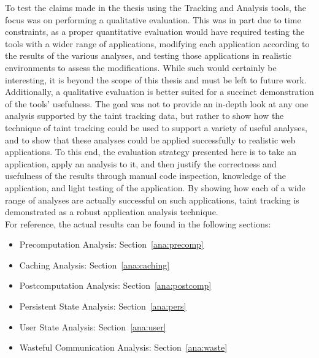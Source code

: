 \documentclass[msc,oneside]{ubcthesis}
\begin{document}
To test the claims made in the thesis using the Tracking and Analysis tools, the focus was on performing a qualitative evaluation. This was in part due to time constraints, as a proper quantitative evaluation would have required testing the tools with a wider range of applications, modifying each application according to the results of the various analyses, and testing those applications in realistic environments to assess the modifications. While such would certainly be interesting, it is beyond the scope of this thesis and must be left to future work. Additionally, a qualitative evaluation is better suited for a succinct demonstration of the tools' usefulness. The goal was not to provide an in-depth look at any one analysis supported by the taint tracking data, but rather to show how the technique of taint tracking could be used to support a variety of useful analyses, and to show that these analyses could be applied successfully to realistic web applications. To this end, the evaluation strategy presented here is to take an application, apply an analysis to it, and then justify the correctness and usefulness of the results through manual code inspection, knowledge of the application, and light testing of the application. By showing how each of a wide range of analyses are actually successful on such applications, taint tracking is demonstrated as a robust application analysis technique. \\

For reference, the actual results can be found in the following sections:
\begin{itemize}
\item Precomputation Analysis: Section~\ref{ana:precomp}
\item Caching Analysis: Section~\ref{ana:caching}
\item Postcomputation Analysis: Section~\ref{ana:postcomp}
\item Persistent State Analysis: Section~\ref{ana:pers}
\item User State Analysis: Section~\ref{ana:user}
\item Wasteful Communication Analysis: Section~\ref{ana:waste}
\end{itemize}

 
\end{document}
